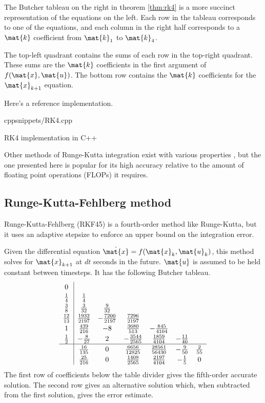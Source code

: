 The Butcher tableau on the right in theorem \ref{thm:rk4} is a more succinct
representation of the equations on the left. Each row in the tableau corresponds
to one of the equations, and each column in the right half corresponds to a
$\mat{k}$ coefficient from $\mat{k}_1$ to $\mat{k}_4$.

The top-left quadrant contains the sums of each row in the top-right quadrant.
These sums are the $\mat{k}$ coefficients in the first argument of
$f(\mat{x}, \mat{u})$. The bottom row contains the $\mat{k}$ coefficients for
the $\mat{x}_{k+1}$ equation.

Here's a reference implementation.
\begin{coderemote}{cpp}{snippets/RK4.cpp}
  \caption{RK4 implementation in C++}
\end{coderemote}

Other methods of Runge-Kutta integration exist with various properties
\cite{bib:wiki_rk4}, but the one presented here is popular for its high accuracy
relative to the amount of floating point operations (FLOPs) it requires.

\subsection{Runge-Kutta-Fehlberg method}

Runge-Kutta-Fehlberg (RKF45) is a fourth-order method like Runge-Kutta, but it
uses an adaptive stepsize to enforce an upper bound on the integration error.
\begin{theorem}
  Given the differential equation $\dot{\mat{x}} = f(\mat{x}_k, \mat{u}_k)$,
  this method solves for $\mat{x}_{k+1}$ at $dt$ seconds in the future.
  $\mat{u}$ is assumed to be held constant between timesteps. It has the
  following Butcher tableau.
  \begin{equation*}
    \renewcommand\arraystretch{1.2}
    \begin{array}{c|ccccccc}
      0 \\
      \frac{1}{4} & \frac{1}{4} \\
      \frac{3}{8} & \frac{3}{32} & \frac{9}{32} \\
      \frac{12}{13} & \frac{1932}{2197} & -\frac{7200}{2197} & \frac{7296}{2197}
        \\
      1 & \frac{439}{216} & -8 & \frac{3680}{513} & -\frac{845}{4104} \\
      \frac{1}{2} & -\frac{8}{27} & 2 & -\frac{3544}{2565} & \frac{1859}{4104} &
        -\frac{11}{40} \\
      \hline
      & \frac{16}{135} & 0 & \frac{6656}{12825} & \frac{28561}{56430} &
        -\frac{9}{50} & \frac{2}{55} \\
      & \frac{25}{216} & 0 & \frac{1408}{2565} & \frac{2197}{4104} &
        -\frac{1}{5} & 0
    \end{array}
  \end{equation*}
  The first row of coefficients below the table divider gives the fifth-order
  accurate solution. The second row gives an alternative solution which,
  when subtracted from the first solution, gives the error estimate.
\end{theorem}

